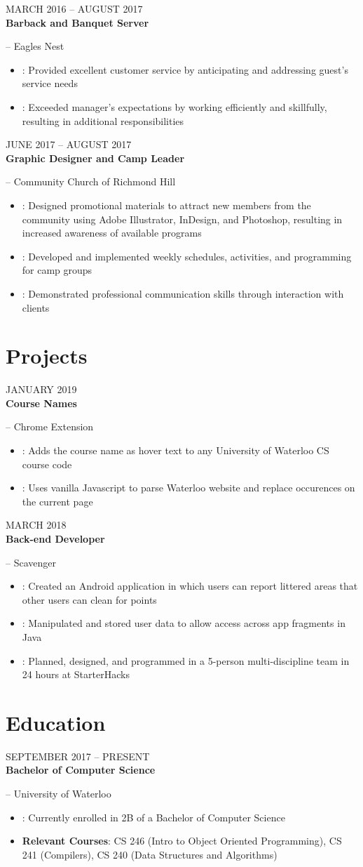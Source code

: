 \documentclass[letterpaper, 11pt]{article}
\newcommand{\styleDate}[1]{
    {{\color{resGray}\MakeTextUppercase{#1}}}
}
\newcommand{\styleDescription}[1]{
    {\color{resGray}#1}
}
\newcommand{\styleEmployer}[1]{
    {\Large{\color{resGray}#1}}
}
\newcommand{\stylePosition}[1]{
    {\Large{\textbf{\color{resBlue}#1}}}
}
\newcommand{\resBulletPoint}[2][]{
    \item\styleDescription{
        \ifthenelse
            {\isempty{#1}}
            {}
            {\textbf{#1}: }
        #2
    }
}
\newcommand{\resItem}[3]{
    \vspace{6pt}
    \styleDate{#3} \\
    \stylePosition{#1}\styleEmployer{-- #2}
}
\newenvironment{resElement}[1][]{
    #1
    \begin{itemize}[leftmargin=2ex, nosep, noitemsep]
}{
    \end{itemize}
}
\begin{document}
    \begin{resElement}[
        \resItem
        {Barback and Banquet Server}
        {Eagles Nest}
        {March 2016 -- August 2017}
    ]
        \resBulletPoint{Provided excellent customer service by anticipating and addressing guest's service needs}
        \resBulletPoint{Exceeded manager's expectations by working efficiently and skillfully, resulting in additional responsibilities}
    \end{resElement}

    \begin{resElement}[
        \resItem
        {Graphic Designer and Camp Leader}
        {Community Church of Richmond Hill}
        {June 2017 -- August 2017}
    ]
        \resBulletPoint{Designed promotional materials to attract new members from the community using Adobe Illustrator, InDesign, and Photoshop, resulting in increased awareness of available programs}
        \resBulletPoint{Developed and implemented weekly schedules, activities, and programming for camp groups}
        \resBulletPoint{Demonstrated professional communication skills through interaction with clients}
    \end{resElement}

\section{Projects}
    \begin{resElement}[
        \resItem
        {Course Names}
        {Chrome Extension}
        {January 2019}
    ]
        \resBulletPoint{Adds the course name as hover text to any University of Waterloo CS course code}
        \resBulletPoint{Uses vanilla Javascript to parse Waterloo website and replace occurences on the current page}
    \end{resElement}

    \begin{resElement}[
        \resItem
        {Back-end Developer}
        {Scavenger}
        {March 2018}
    ]
        \resBulletPoint{Created an Android application in which users can report littered areas that other users can clean for points}
        \resBulletPoint{Manipulated and stored user data to allow access across app fragments in Java}
        \resBulletPoint{Planned, designed, and programmed in a 5-person multi-discipline team in 24 hours at StarterHacks}
    \end{resElement}

\section{Education}
    \begin{resElement}[
        \resItem
        {Bachelor of Computer Science}
        {University of Waterloo}
        {September 2017 -- Present}
    ]
        \resBulletPoint{Currently enrolled in 2B of a Bachelor of Computer Science}
        \resBulletPoint[Relevant Courses]{CS 246 (Intro to Object Oriented Programming), CS 241 (Compilers), CS 240 (Data Structures and Algorithms)}
    \end{resElement}
\end{document}
